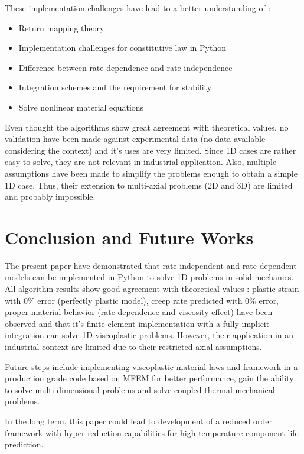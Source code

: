\documentclass[final,5p,times,twocolumn]{elsarticle}
\begin{document}
These implementation challenges have lead to a better understanding of :
\begin{itemize}
  \item Return mapping theory
  \item Implementation challenges for constitutive law in Python
  \item Difference between rate dependence and rate independence
  \item Integration schemes and the requirement for stability
  \item Solve nonlinear material equations
\end{itemize} 

Even thought the algorithms show great agreement with theoretical values, no validation have been made against experimental data (no data available considering the context) and it's uses are very limited. Since 1D cases are rather easy to solve, they are not relevant in industrial application. Also, multiple assumptions have been made to simplify the problems enough to obtain a simple 1D case. Thus, their extension to multi-axial problems (2D and 3D) are limited and probably impossible.

\section{Conclusion and Future Works}
\label{sec:Conclusion}
The present paper have demonstrated that rate independent and rate dependent models can be implemented in Python to solve 1D problems in solid mechanics. All algorithm results show good agreement with theoretical values : plastic strain with 0\% error (perfectly plastic model), creep rate predicted with 0\% error, proper material behavior (rate dependence and viscosity effect) have been observed and that it's finite element implementation with a fully implicit integration can solve 1D viscoplastic problems. However, their application in an industrial context are limited due to their restricted axial assumptions.

Future steps include implementing viscoplastic material laws and framework in a production grade code based on MFEM \cite{mfem-2024} for better performance, gain the ability to solve multi-dimensional problems and solve coupled thermal-mechanical problems. 

In the long term, this paper could lead to development of a reduced order framework with hyper reduction capabilities for high temperature component life prediction.
\end{document}
